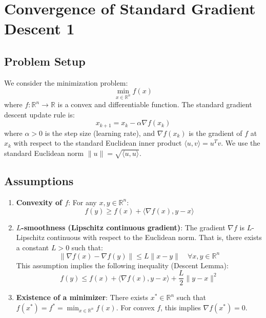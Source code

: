 \documentclass{article}
\newcommand{\R}{\mathbb{R}}
\newcommand{\norm}[1]{\|#1\|}          %
\newcommand{\ip}[2]{\langle #1, #2 \rangle} %
\newcommand{\grad}{\nabla}             %
\begin{document}
\section*{Convergence of Standard Gradient Descent 1}

\subsection*{Problem Setup}
We consider the minimization problem:
\begin{equation*}
    \min_{x \in \R^n} f(x)
\end{equation*}
where $f: \R^n \to \R$ is a convex and differentiable function.
The standard gradient descent update rule is:
\begin{equation} \label{eq:gd_update}
    x_{k+1} = x_k - \alpha \grad f(x_k)
\end{equation}
where $\alpha > 0$ is the step size (learning rate), and $\grad f(x_k)$ is the gradient of $f$ at $x_k$ with respect to the standard Euclidean inner product $\ip{u}{v} = u^T v$. We use the standard Euclidean norm $\norm{u} = \sqrt{\ip{u}{u}}$.

\subsection*{Assumptions}
\begin{enumerate}
    \item \textbf{Convexity of $f$}: For any $x, y \in \R^n$:
          \begin{equation} \label{eq:convexity}
              f(y) \ge f(x) + \ip{\grad f(x)}{y-x}
          \end{equation}
    \item \textbf{$L$-smoothness (Lipschitz continuous gradient)}: The gradient $\grad f$ is $L$-Lipschitz continuous with respect to the Euclidean norm. That is, there exists a constant $L > 0$ such that:
          \begin{equation} \label{eq:l_smoothness}
              \norm{\grad f(x) - \grad f(y)} \le L \norm{x - y} \quad \forall x, y \in \R^n
          \end{equation}
          This assumption implies the following inequality (Descent Lemma):
          \begin{equation} \label{eq:descent_lemma}
              f(y) \le f(x) + \ip{\grad f(x)}{y-x} + \frac{L}{2} \norm{y-x}^2
          \end{equation}
    \item \textbf{Existence of a minimizer}: There exists $x^* \in \R^n$ such that $f(x^*) = f^* = \min_{x \in \R^n} f(x)$. For convex $f$, this implies $\grad f(x^*) = 0$.
\end{enumerate}
\end{document}
